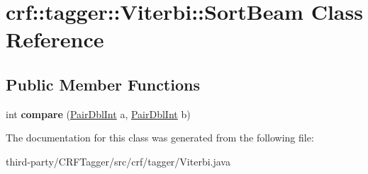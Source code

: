 \hypertarget{classcrf_1_1tagger_1_1Viterbi_1_1SortBeam}{
\section{crf::tagger::Viterbi::SortBeam Class Reference}
\label{classcrf_1_1tagger_1_1Viterbi_1_1SortBeam}
}
\subsection*{Public Member Functions}
\begin{DoxyCompactItemize}
\item 
\hypertarget{classcrf_1_1tagger_1_1Viterbi_1_1SortBeam_a3f15f74e155e390c1d69a2694fc48aa7}{
int {\bfseries compare} (\hyperlink{classcrf_1_1tagger_1_1Viterbi_1_1PairDblInt}{PairDblInt} a, \hyperlink{classcrf_1_1tagger_1_1Viterbi_1_1PairDblInt}{PairDblInt} b)}
\label{classcrf_1_1tagger_1_1Viterbi_1_1SortBeam_a3f15f74e155e390c1d69a2694fc48aa7}

\end{DoxyCompactItemize}


The documentation for this class was generated from the following file:\begin{DoxyCompactItemize}
\item 
third-\/party/CRFTagger/src/crf/tagger/Viterbi.java\end{DoxyCompactItemize}
